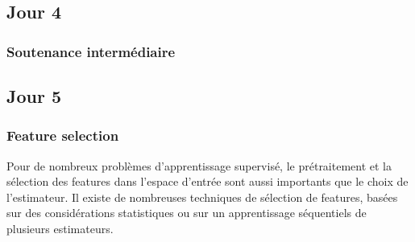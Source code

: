 \documentclass[
10pt, %
a4paper, %
oneside, %
headinclude,footinclude, %
BCOR5mm, %
]{scrartcl}
\begin{document}

\subsection{\large{Jour 4}}%
\label{sec:Jour 4}

\subsubsection{Soutenance intermédiaire}%
\label{ssub:soutenance_finale}

\subsection{\large{Jour 5}}%
\label{sec:Jour 5}

\subsubsection{Feature selection}%
\label{ssub:}

Pour de nombreux problèmes d'apprentissage supervisé, le prétraitement et la sélection des features dans l'espace d'entrée sont aussi importants que le choix de l'estimateur. Il existe de nombreuses techniques de sélection de features, basées sur des considérations statistiques ou sur un apprentissage séquentiels de plusieurs estimateurs.

%


%
\end{document}

